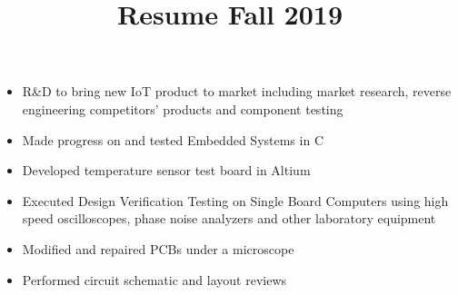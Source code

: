 \documentclass[10pt,a4paper]{altacv}
\title{Resume Fall 2019}
\begin{document}

\begin{fullwidth}
\makecvheader
\end{fullwidth}



\begin{itemize}
\item R\&D to bring new IoT product to market including market research, reverse engineering competitors' products and component testing
\item Made progress on and tested Embedded Systems in C
\item Developed temperature sensor test board in Altium
\end{itemize}

\divider

\begin{itemize}
\item Executed Design Verification Testing on Single Board Computers using high speed oscilloscopes, phase noise analyzers and other laboratory equipment
\item Modified and repaired PCBs under a microscope
\item Performed circuit schematic and layout reviews  
\end{itemize}
\end{document}

